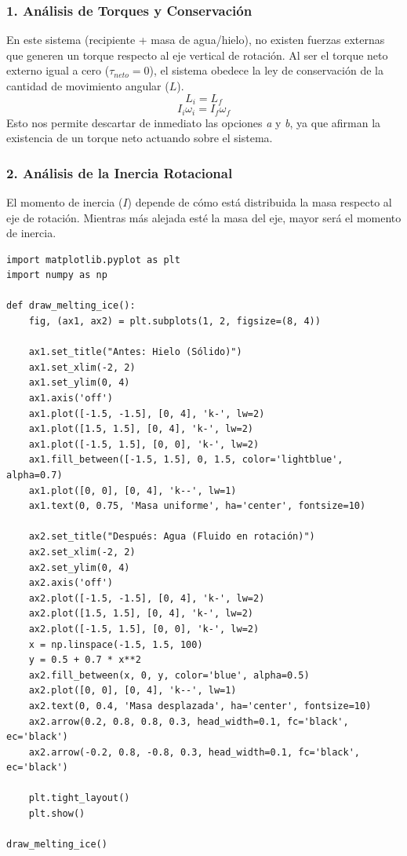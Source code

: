 \documentclass[12pt, a4paper]{article}
\begin{document}
\subsubsection*{1. Análisis de Torques y Conservación}
En este sistema (recipiente + masa de agua/hielo), no existen fuerzas externas que generen un torque respecto al eje vertical de rotación. Al ser el torque neto externo igual a cero ($\tau_{neto} = 0$), el sistema obedece la ley de conservación de la cantidad de movimiento angular ($L$).
$$L_i = L_f$$
$$I_i \omega_i = I_f \omega_f$$
Esto nos permite descartar de inmediato las opciones \textit{a} y \textit{b}, ya que afirman la existencia de un torque neto actuando sobre el sistema.

\subsubsection*{2. Análisis de la Inercia Rotacional}
El momento de inercia ($I$) depende de cómo está distribuida la masa respecto al eje de rotación. Mientras más alejada esté la masa del eje, mayor será el momento de inercia.

\begin{lstlisting}
import matplotlib.pyplot as plt
import numpy as np

def draw_melting_ice():
    fig, (ax1, ax2) = plt.subplots(1, 2, figsize=(8, 4))
    
    ax1.set_title("Antes: Hielo (Sólido)")
    ax1.set_xlim(-2, 2)
    ax1.set_ylim(0, 4)
    ax1.axis('off')
    ax1.plot([-1.5, -1.5], [0, 4], 'k-', lw=2)
    ax1.plot([1.5, 1.5], [0, 4], 'k-', lw=2)
    ax1.plot([-1.5, 1.5], [0, 0], 'k-', lw=2)
    ax1.fill_between([-1.5, 1.5], 0, 1.5, color='lightblue', alpha=0.7)
    ax1.plot([0, 0], [0, 4], 'k--', lw=1)
    ax1.text(0, 0.75, 'Masa uniforme', ha='center', fontsize=10)
    
    ax2.set_title("Después: Agua (Fluido en rotación)")
    ax2.set_xlim(-2, 2)
    ax2.set_ylim(0, 4)
    ax2.axis('off')
    ax2.plot([-1.5, -1.5], [0, 4], 'k-', lw=2)
    ax2.plot([1.5, 1.5], [0, 4], 'k-', lw=2)
    ax2.plot([-1.5, 1.5], [0, 0], 'k-', lw=2)
    x = np.linspace(-1.5, 1.5, 100)
    y = 0.5 + 0.7 * x**2
    ax2.fill_between(x, 0, y, color='blue', alpha=0.5)
    ax2.plot([0, 0], [0, 4], 'k--', lw=1)
    ax2.text(0, 0.4, 'Masa desplazada', ha='center', fontsize=10)
    ax2.arrow(0.2, 0.8, 0.8, 0.3, head_width=0.1, fc='black', ec='black')
    ax2.arrow(-0.2, 0.8, -0.8, 0.3, head_width=0.1, fc='black', ec='black')
    
    plt.tight_layout()
    plt.show()

draw_melting_ice()
\end{lstlisting}
\end{document}
